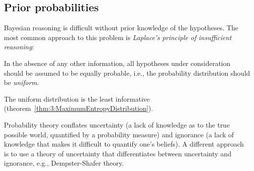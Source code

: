 \subsection{Prior probabilities}

Bayesian reasoning is difficult without prior knowledge of the hypotheses.
The most common approach to this problem is \textit{Laplace's principle of insufficient reasoning}:
\begin{displayquote}
  In the absence of any other information, all hypotheses under consideration
  should be assumed to be equally probable, i.e., the probability distribution
  should be \textit{uniform}.
\end{displayquote}
The uniform distribution is the least informative
(theorem~\ref{thm:3:MaximumEntropyDistribution}).

Probability theory conflates uncertainty (a lack of knowledge as to the true
possible world, quantified by a probability measure) and ignorance (a lack of
knowledge that makes it difficult to quantify one's beliefs).
A different approach is to use a theory of uncertainty that differentiates
between uncertainty and ignorance, e.g., Dempster-Shafer theory.
